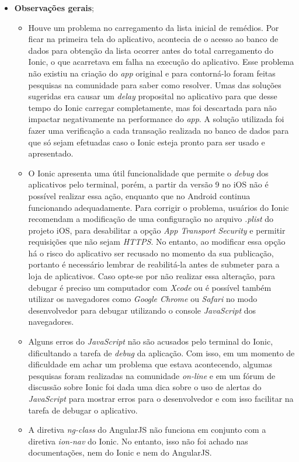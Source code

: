 \begin{itemize}
 	\item \textbf{Observações gerais};
	\begin{itemize}
		\item Houve um problema no carregamento da lista inicial de remédios. Por ficar na primeira tela do aplicativo, acontecia de o acesso ao banco de dados para obtenção da lista ocorrer antes do total carregamento do Ionic, o que 
		acarretava em falha na execução do aplicativo. Esse problema não existiu na criação do \textit{app} original e para contorná-lo foram feitas pesquisas na comunidade para saber como resolver.
		Umas das soluções sugeridas era causar um \textit{delay} proposital no aplicativo para que desse tempo do Ionic carregar completamente, mas foi descartada para não impactar negativamente na performance do
		\textit{app}. A solução utilizada foi fazer uma verificação a cada transação realizada no banco de dados para que só sejam efetuadas caso o Ionic esteja pronto para ser usado e apresentado.
		\item O Ionic apresenta uma útil funcionalidade que permite o \textit{debug} dos aplicativos pelo terminal, porém, a partir da versão 9 no iOS não é possível realizar essa ação, enquanto que no Android continua funcionando adequadamente.
		Para corrigir o problema, usuários do Ionic recomendam a modificação de uma configuração no arquivo \textit{.plist} do projeto iOS, para desabilitar a opção \textit{App Transport Security} e permitir requisições que não  sejam \textit{HTTPS}. No entanto, ao modificar essa opção há o risco do aplicativo ser recusado no momento da sua publicação, portanto é necessário lembrar de reabilitá-la antes de submeter para a loja de aplicativos.
		Caso opte-se por não realizar essa alteração, para debugar é preciso um computador com \textit{Xcode} ou é possível também utilizar os navegadores como \textit{Google Chrome} ou \textit{Safari}
		no modo desenvolvedor para debugar utilizando o console \textit{JavaScript} dos navegadores.
		\item Alguns erros do \textit{JavaScript} não são acusados pelo terminal do Ionic, dificultando a tarefa de \textit{debug} da aplicação. 
		Com isso, em um momento de dificuldade em achar um problema que estava acontecendo, algumas pesquisas foram realizadas na comunidade \textit{on-line} e em um fórum 
		de discussão sobre Ionic foi dada uma dica sobre o uso de alertas do \textit{JavaScript} para mostrar erros para o desenvolvedor e com isso facilitar na tarefa de debugar o aplicativo.
		\item A diretiva \textit{ng-class} do AngularJS não funciona em conjunto com a diretiva \textit{ion-nav} do Ionic. No entanto, isso não foi achado nas documentações, nem do Ionic e nem do AngularJS. 

\end{itemize}
\end{itemize}
